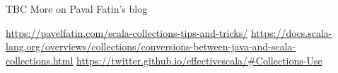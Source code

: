 \documentclass[aspectratio=169]{beamer}
\begin{document}
\begin{frame}{TBC}
  \centering\Large More on Paval Fatin's blog \cite{pasha-collections}
\end{frame}

\begin{thebibliography}{9}
  \url{https://pavelfatin.com/scala-collections-tips-and-tricks/}
  \url{https://docs.scala-lang.org/overviews/collections/conversions-between-java-and-scala-collections.html}
  \url{https://twitter.github.io/effectivescala/#Collections-Use}
\end{thebibliography}
\end{document}

